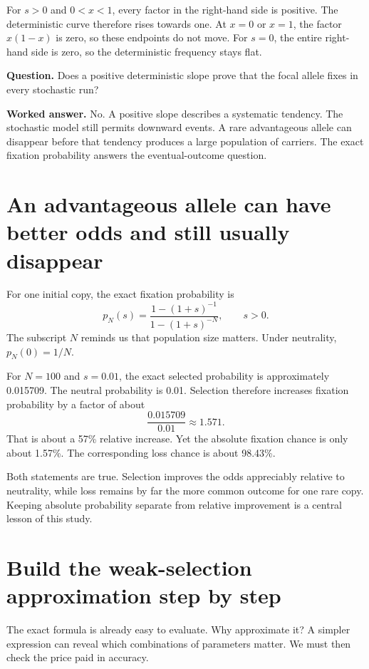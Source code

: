 For $s>0$ and $0<x<1$, every factor in the right-hand side is positive. The deterministic curve therefore rises towards one. At $x=0$ or $x=1$, the factor $x(1-x)$ is zero, so these endpoints do not move. For $s=0$, the entire right-hand side is zero, so the deterministic frequency stays flat.

\begin{checkpoint}
\textbf{Question.} Does a positive deterministic slope prove that the focal allele fixes in every stochastic run?

\textbf{Worked answer.} No. A positive slope describes a systematic tendency. The stochastic model still permits downward events. A rare advantageous allele can disappear before that tendency produces a large population of carriers. The exact fixation probability answers the eventual-outcome question.
\end{checkpoint}

\section{An advantageous allele can have better odds and still usually disappear}

For one initial copy, the exact fixation probability is
\begin{equation}
p_N(s)=\frac{1-(1+s)^{-1}}{1-(1+s)^{-N}},
\qquad s>0.
\label{eq:single-copy-exact}
\end{equation}
The subscript $N$ reminds us that population size matters. Under neutrality, $p_N(0)=1/N$.

For $N=100$ and $s=0.01$, the exact selected probability is approximately 0.015709. The neutral probability is 0.01. Selection therefore increases fixation probability by a factor of about
\[
\frac{0.015709}{0.01}\approx1.571.
\]
That is about a 57\% relative increase. Yet the absolute fixation chance is only about 1.57\%. The corresponding loss chance is about 98.43\%.

Both statements are true. Selection improves the odds appreciably relative to neutrality, while loss remains by far the more common outcome for one rare copy. Keeping absolute probability separate from relative improvement is a central lesson of this study.

\section{Build the weak-selection approximation step by step}

The exact formula is already easy to evaluate. Why approximate it? A simpler expression can reveal which combinations of parameters matter. We must then check the price paid in accuracy.

